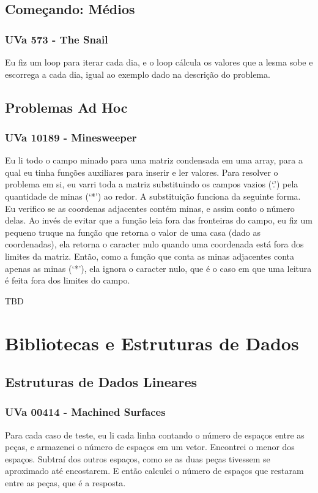 \documentclass[11pt]{scrartcl}
\begin{document}
\subsection{Começando: Médios}
\subsubsection{UVa 573 - The Snail}
Eu fiz um loop para iterar cada dia, e o loop cálcula os valores que a lesma sobe e escorrega a cada dia, igual ao exemplo dado na descrição do problema.


\subsection{Problemas Ad Hoc}
\subsubsection{UVa 10189 - Minesweeper}
Eu li todo o campo minado para uma matriz condensada em uma array, para a qual eu tinha funções auxiliares para inserir e ler valores. Para resolver o problema em si, eu varri toda a matriz substituindo os campos vazios (`.') pela quantidade de minas (`*') ao redor. A substituição funciona da seguinte forma. Eu verifico se as coordenas adjacentes contém minas, e assim conto o número delas. Ao invés de evitar que a função leia fora das fronteiras do campo, eu fiz um pequeno truque na função que retorna o valor de uma casa (dado as coordenadas), ela retorna o caracter nulo quando uma coordenada está fora dos limites da matriz. Então, como a função que conta as minas adjacentes conta apenas as minas (`*'), ela ignora o caracter nulo, que é o caso em que uma leitura é feita fora dos limites do campo.


TBD

\section{Bibliotecas e Estruturas de Dados}

\subsection{Estruturas de Dados Lineares}
\subsubsection{UVa 00414 - Machined Surfaces}
Para cada caso de teste, eu li cada linha contando o número de espaços entre as peças, e armazenei o número de espaços em um vetor. Encontrei o menor dos espaços. Subtraí dos outros espaços, como se as duas peças tivessem se aproximado até encostarem. E então calculei o número de espaços que restaram entre as peças, que é a resposta.

\end{document}
